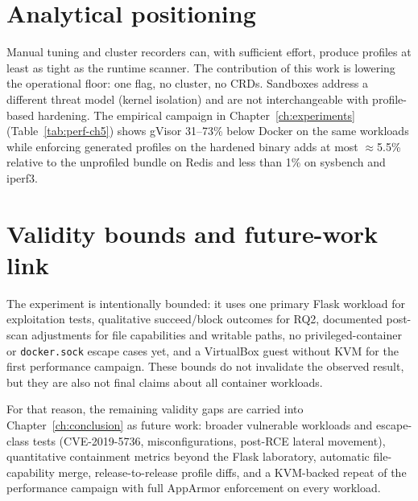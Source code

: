 \section{Analytical positioning}\label{sec:disc-positioning}

Manual tuning and cluster recorders can, with sufficient effort, produce profiles at least as tight as the runtime scanner. The contribution of this work is lowering the operational floor: one flag, no cluster, no CRDs. Sandboxes address a different threat model (kernel isolation) and are not interchangeable with profile-based hardening. The empirical campaign in Chapter~\ref{ch:experiments} (Table~\ref{tab:perf-ch5}) shows gVisor 31--73\% below Docker on the same workloads while enforcing generated profiles on the hardened binary adds at most $\approx$5.5\% relative to the unprofiled bundle on Redis and less than 1\% on sysbench and iperf3.

\section{Validity bounds and future-work link}\label{sec:disc-validity}

The experiment is intentionally bounded: it uses one primary Flask workload for exploitation tests, qualitative succeed/block outcomes for RQ2, documented post-scan adjustments for file capabilities and writable paths, no privileged-container or \texttt{docker.sock} escape cases yet, and a VirtualBox guest without KVM for the first performance campaign. These bounds do not invalidate the observed result, but they are also not final claims about all container workloads.

For that reason, the remaining validity gaps are carried into Chapter~\ref{ch:conclusion} as future work: broader vulnerable workloads and escape-class tests (CVE-2019-5736, misconfigurations, post-RCE lateral movement), quantitative containment metrics beyond the Flask laboratory, automatic file-capability merge, release-to-release profile diffs, and a KVM-backed repeat of the performance campaign with full AppArmor enforcement on every workload.
